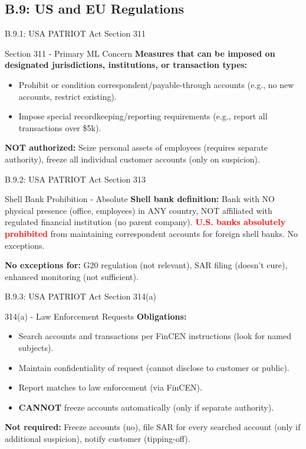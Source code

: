 \documentclass{beamer}
\begin{document}
	\subsection{B.9: US and EU Regulations}
	
	\begin{frame}{B.9.1: USA PATRIOT Act Section 311}
		\begin{block}{Section 311 - Primary ML Concern}
			\textbf{Measures that can be imposed on designated jurisdictions, institutions, or transaction types:}
			\begin{itemize}
				\item Prohibit or condition correspondent/payable-through accounts (e.g., no new accounts, restrict existing).
				\item Impose special recordkeeping/reporting requirements (e.g., report all transactions over \$5k).
			\end{itemize}
		\end{block}
		\textbf{NOT authorized:} Seize personal assets of employees (requires separate authority), freeze all individual customer accounts (only on suspicion).
	\end{frame}
	
	\begin{frame}{B.9.2: USA PATRIOT Act Section 313}
		\begin{block}{Shell Bank Prohibition - Absolute}
			\textbf{Shell bank definition:} Bank with NO physical presence (office, employees) in ANY country, NOT affiliated with regulated financial institution (no parent company).
			\vspace{0.2cm}
			\textcolor{red}{\textbf{U.S. banks absolutely prohibited}} from maintaining correspondent accounts for foreign shell banks. No exceptions.
		\end{block}
		\textbf{No exceptions for:} G20 regulation (not relevant), SAR filing (doesn't cure), enhanced monitoring (not sufficient).
	\end{frame}
	
	\begin{frame}{B.9.3: USA PATRIOT Act Section 314(a)}
		\begin{block}{314(a) - Law Enforcement Requests}
			\textbf{Obligations:}
			\begin{itemize}
				\item Search accounts and transactions per FinCEN instructions (look for named subjects).
				\item Maintain confidentiality of request (cannot disclose to customer or public).
				\item Report matches to law enforcement (via FinCEN).
				\item \textbf{CANNOT} freeze accounts automatically (only if separate authority).
			\end{itemize}
		\end{block}
		\textbf{Not required:} Freeze accounts (no), file SAR for every searched account (only if additional suspicion), notify customer (tipping-off).
	\end{frame}
	
\end{document}
